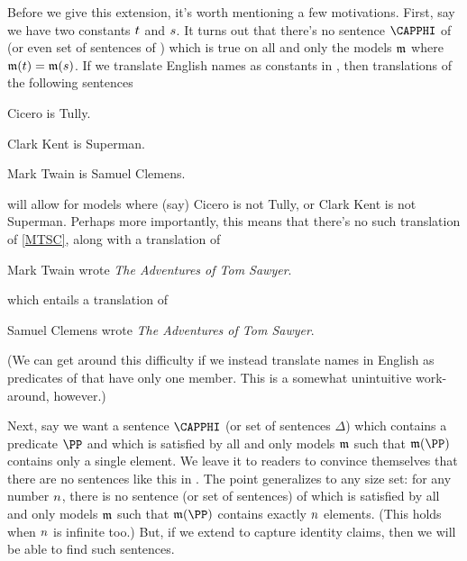 
Before we give this extension, it's worth mentioning a few motivations. 
First, say we have two constants $t$ and $s$. 
It turns out that there's no sentence $\CAPPHI$ of \GQL{} (or even set of sentences of \GQL{}) which is true on all and only the models $\mathfrak{m}$ where $\mathfrak{m}(t)=\mathfrak{m}(s)$. 
If we translate English names as constants in \GQL{}, then translations of the following sentences
\begin{menumerate}
\item\label{CiceroTully} Cicero is Tully.
\item\label{Superman} Clark Kent is Superman.
\item\label{MTSC} Mark Twain is Samuel Clemens.
\end{menumerate} 
will allow for models where (say) Cicero is not Tully, or Clark Kent is not Superman.
Perhaps more importantly, this means that there's no such translation of \ref{MTSC}, along with a translation of 
\begin{menumerate}
\item Mark Twain wrote \emph{The Adventures of Tom Sawyer}.
\end{menumerate}
which entails a translation of 
\begin{menumerate}
\item Samuel Clemens wrote \emph{The Adventures of Tom Sawyer}.
\end{menumerate}
(We can get around this difficulty if we instead translate names in English as predicates of \GQL{} that have only one member.  This is a somewhat unintuitive work-around, however.)

Next, say we want a sentence $\CAPPHI$ (or set of sentences $\Delta$) which contains a predicate $\PP$ and which is satisfied by all and only models $\mathfrak{m}$ such that $\IntA(\PP)$ contains only a single element. 
We leave it to readers to convince themselves that there are no sentences like this in \GQL{}.
The point generalizes to any size set: for any number $n$, there is no sentence (or set of sentences) of \GQL{} which is satisfied by all and only models $\mathfrak{m}$ such that $\IntA(\PP)$ contains exactly $n$ elements. 
(This holds when $n$ is infinite too.)
But, if we extend \GQL{} to capture identity claims, then we will be able to find such sentences. 

